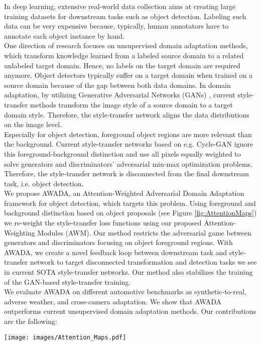\documentclass[10pt,twocolumn,letterpaper]{article}
\begin{document}
In deep learning, extensive real-world data collection aims at creating large training datasets for downstream tasks such as object detection. Labeling such data can be very expensive because, typically, human annotators have to annotate each object instance by hand. \\
One direction of research focuses on unsupervised domain adaptation methods, which transform knowledge learned from a labeled source domain to a related unlabeled target domain. Hence, no labels on the target domain are required anymore. Object detectors typically suffer on a target domain when trained on a source domain because of the gap between both data domains. In domain adaptation, by utilizing Generative Adversarial Networks (GANs) \cite{goodfellow2014generative}, current style-transfer methods transform the image style of a source domain to a target domain style. Therefore, the style-transfer network aligns the data distributions on the image level. \\
Especially for object detection, foreground object regions are more relevant than the background. Current style-transfer networks based on e.g. Cycle-GAN \cite{CycleGAN} ignore this foreground-background distinction and use all pixels equally weighted to solve generators and discriminators' adversarial min-max optimization problems. Therefore, the style-transfer network is disconnected from the final downstream task, i.e. object detection. \\
We propose AWADA, an Attention-Weighted Adversarial Domain Adaptation framework for object detection, which targets this problem. Using foreground and background distinction based on object proposals (see Figure \ref{fig:AttentionMaps}) we re-weight the style-transfer loss functions using our proposed Attention-Weighting Modules (AWM). Our method restricts the adversarial game between generators and discriminators focusing on object foreground regions. With AWADA, we create a novel feedback loop between downstream task and style-transfer network to target disconnected transformation and detection tasks we see in current SOTA style-transfer networks. Our method also stabilizes the training of the GAN-based style-transfer training. \\
We evaluate AWADA on different automotive benchmarks as synthetic-to-real, adverse weather, and cross-camera adaptation. We show that AWADA outperforms current unsupervised domain adaptation methods. Our contributions are the following:

\begin{figure*}[t]
	\centering
	\texttt{[image: images/Attention\_Maps.pdf]}
	\caption{Exemplary images and corresponding attention maps constructed from object detector proposals of sim10k \cite{sim10k} on the left and Cityscapes \cite{Cityscapes} on the right. Bright overlays mark attention regions of foreground object used to re-weight our GAN losses. Note that only car objects are used to construct attention maps for both images.}
	\label{fig:AttentionMaps}
\end{figure*}
\end{document}

